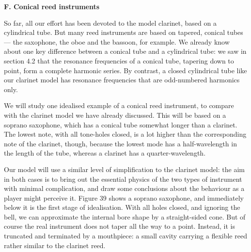 

  \textbf{F. Conical reed instruments} 

  So far, all our effort has been devoted to the model clarinet, based on a 
  cylindrical tube. But many reed instruments are based on tapered, conical 
  tubes — the saxophone, the oboe and the bassoon, for example. We already know 
  about one key difference between a conical tube and a cylindrical tube: we 
  saw in section 4.2 that the resonance frequencies of a conical tube, tapering 
  down to point, form a complete harmonic series. By contrast, a closed 
  cylindrical tube like our clarinet model has resonance frequencies that are 
  odd-numbered harmonics only. 

  We will study one idealised example of a conical reed instrument, to compare 
  with the clarinet model we have already discussed. This will be based on a 
  soprano saxophone, which has a conical tube somewhat longer than a clarinet. 
  The lowest note, with all tone-holes closed, is a lot higher than the 
  corresponding note of the clarinet, though, because the lowest mode has a 
  half-wavelength in the length of the tube, whereas a clarinet has a 
  quarter-wavelength. 

  Our model will use a similar level of simplification to the clarinet model: 
  the aim in both cases is to bring out the essential physics of the two types 
  of instrument with minimal complication, and draw some conclusions about the 
  behaviour as a player might perceive it. Figure 39 shows a soprano saxophone, 
  and immediately below it is the first stage of idealisation. With all holes 
  closed, and ignoring the bell, we can approximate the internal bore shape by 
  a straight-sided cone. But of course the real instrument does not taper all 
  the way to a point. Instead, it is truncated and terminated by a mouthpiece: 
  a small cavity carrying a flexible reed rather similar to the clarinet reed. 


